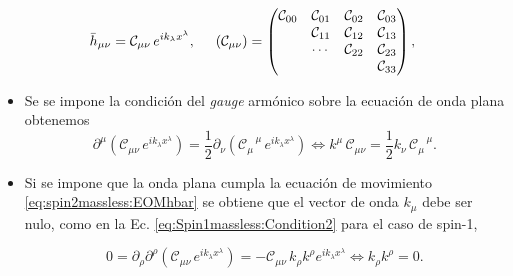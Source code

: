 {\begin{equation} \label{eq:spin2massless:hondaplana}
	\bar{h}_{\mu\nu} = \mathcal{C}_{\mu\nu} \, e^{ik_{\lambda}x^{\lambda}}, \hspace{5mm} 
	( \mathcal{C}_{\mu\nu} ) =  \begin{pmatrix}
							\mathcal{C}_{00} & \mathcal{C}_{01} & \mathcal{C}_{02} & \mathcal{C}_{03}\\
							& \mathcal{C}_{11} & \mathcal{C}_{12} & \mathcal{C}_{13}\\
							&  \cdots & \mathcal{C}_{22} & \mathcal{C}_{23}\\
							&  & & \mathcal{C}_{33}\\
					      \end{pmatrix},
\end{equation}


\begin{itemize}
	\item Se se impone la condición del \textit{gauge} armónico sobre la ecuación de onda plana obtenemos
	\begin{equation} \label{eq:spin2massless:condition1}
		\partial^{\mu} \left( \mathcal{C}_{\mu\nu} \, e^{ik_{\lambda}x^{\lambda}} \right) = 
		\frac{1}{2} \partial_{\nu} \left( \mathcal{C}_{\mu}^{\;\;\;\mu} \, e^{ik_{\lambda}x^{\lambda}} \right) \iff 
		k^{\mu}\, \mathcal{C}_{\mu\nu} = \frac{1}{2} k_{\nu}\, \mathcal{C}_{\mu}^{\;\;\;\mu}.
	\end{equation}

	\item Si se impone que la onda plana cumpla la ecuación de movimiento \eqref{eq:spin2massless:EOMhbar} se obtiene que el vector de onda $k_{\mu}$ debe ser nulo, como en la Ec. \eqref{eq:Spin1massless:Condition2} para el caso de spin-1,

	\begin{equation} \label{eq:spin2massless:condition2}
		0 = \partial_{\rho}\partial^{\rho} \left( \mathcal{C}_{\mu\nu} \, e^{ik_{\lambda}x^{\lambda}} \right) =
	      		- \mathcal{C}_{\mu\nu} \, k_{\rho}k^{\rho} e^{ik_{\lambda}x^{\lambda}} \iff k_{\rho}k^{\rho}  = 0.
	\end{equation}
\end{itemize}

}
